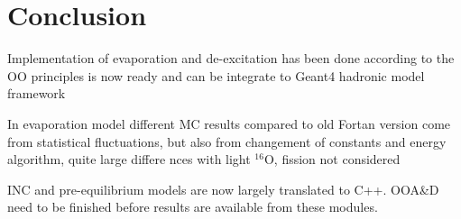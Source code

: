 \section{Conclusion}

Implementation of evaporation and de-excitation has been done according to the
OO principles is now ready and can be integrate to Geant4 hadronic
model framework

In evaporation model different MC results compared to old Fortan
version come from statistical fluctuations, 
but also from changement of constants and energy algorithm, 
quite large differe
nces with light $^{16}$O, fission not considered

INC and pre-equilibrium models are now largely translated to
C++. OOA\&D need to be finished before results are available from
these modules.
 
